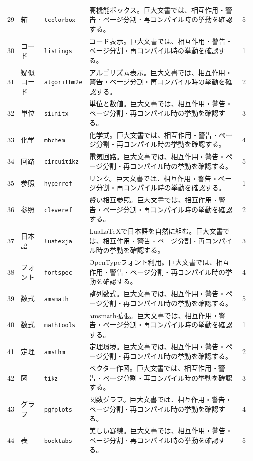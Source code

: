 \documentclass[12pt,a4paper,openany]{ltjsbook}
\theoremstyle{definition}
\theoremstyle{plain}
\theoremstyle{remark}
\begin{document}
\begin{landscape}
\begin{longtable}{llp{55mm}p{80mm}r}
29 & 箱 & \texttt{tcolorbox} & 高機能ボックス。巨大文書では、相互作用・警告・ページ分割・再コンパイル時の挙動を確認する。 & 5\\
30 & コード & \texttt{listings} & コード表示。巨大文書では、相互作用・警告・ページ分割・再コンパイル時の挙動を確認する。 & 1\\
31 & 疑似コード & \texttt{algorithm2e} & アルゴリズム表示。巨大文書では、相互作用・警告・ページ分割・再コンパイル時の挙動を確認する。 & 2\\
32 & 単位 & \texttt{siunitx} & 単位と数値。巨大文書では、相互作用・警告・ページ分割・再コンパイル時の挙動を確認する。 & 3\\
33 & 化学 & \texttt{mhchem} & 化学式。巨大文書では、相互作用・警告・ページ分割・再コンパイル時の挙動を確認する。 & 4\\
34 & 回路 & \texttt{circuitikz} & 電気回路。巨大文書では、相互作用・警告・ページ分割・再コンパイル時の挙動を確認する。 & 5\\
35 & 参照 & \texttt{hyperref} & リンク。巨大文書では、相互作用・警告・ページ分割・再コンパイル時の挙動を確認する。 & 1\\
36 & 参照 & \texttt{cleveref} & 賢い相互参照。巨大文書では、相互作用・警告・ページ分割・再コンパイル時の挙動を確認する。 & 2\\
37 & 日本語 & \texttt{luatexja} & LuaLaTeXで日本語を自然に組む。巨大文書では、相互作用・警告・ページ分割・再コンパイル時の挙動を確認する。 & 3\\
38 & フォント & \texttt{fontspec} & OpenTypeフォント利用。巨大文書では、相互作用・警告・ページ分割・再コンパイル時の挙動を確認する。 & 4\\
39 & 数式 & \texttt{amsmath} & 整列数式。巨大文書では、相互作用・警告・ページ分割・再コンパイル時の挙動を確認する。 & 5\\
40 & 数式 & \texttt{mathtools} & amsmath拡張。巨大文書では、相互作用・警告・ページ分割・再コンパイル時の挙動を確認する。 & 1\\
41 & 定理 & \texttt{amsthm} & 定理環境。巨大文書では、相互作用・警告・ページ分割・再コンパイル時の挙動を確認する。 & 2\\
42 & 図 & \texttt{tikz} & ベクター作図。巨大文書では、相互作用・警告・ページ分割・再コンパイル時の挙動を確認する。 & 3\\
43 & グラフ & \texttt{pgfplots} & 関数グラフ。巨大文書では、相互作用・警告・ページ分割・再コンパイル時の挙動を確認する。 & 4\\
44 & 表 & \texttt{booktabs} & 美しい罫線。巨大文書では、相互作用・警告・ページ分割・再コンパイル時の挙動を確認する。 & 5\\

\end{longtable}
\end{landscape}
\end{document}
